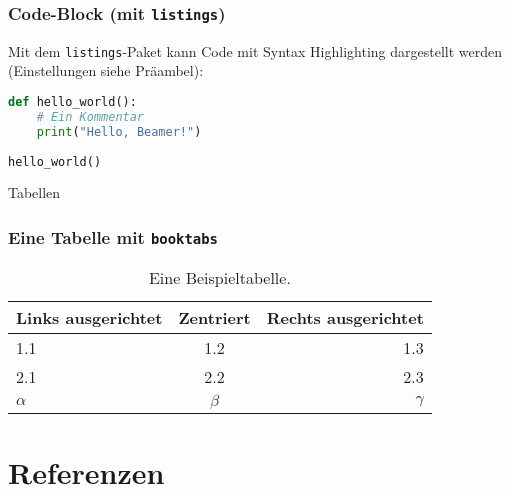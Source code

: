 \documentclass[12pt, aspectratio=169]{beamer}
\begin{document}
\begin{frame}[fragile] %
    \frametitle{Code-Block (mit \texttt{listings})}
    
    Mit dem \texttt{listings}-Paket kann Code mit Syntax Highlighting
    dargestellt werden (Einstellungen siehe Präambel):
    
    \begin{lstlisting}[language=Python, caption={Ein Python-Beispiel}]
def hello_world():
    # Ein Kommentar
    print("Hello, Beamer!")
    
hello_world()
    \end{lstlisting}
\end{frame}

\begin{frame}{Tabellen}
    \frametitle{Eine Tabelle mit \texttt{booktabs}}
    
    \begin{table}
        \centering
        \begin{tabular}{lcr}
            \toprule
            Links ausgerichtet & Zentriert & Rechts ausgerichtet \\
            \midrule
            1.1 & 1.2 & 1.3 \\
            2.1 & 2.2 & 2.3 \\
            $\alpha$ & $\beta$ & $\gamma$ \\
            \bottomrule
        \end{tabular}
        \caption{Eine Beispieltabelle.}
    \end{table}
\end{frame}

\section{Referenzen}
\end{document}
